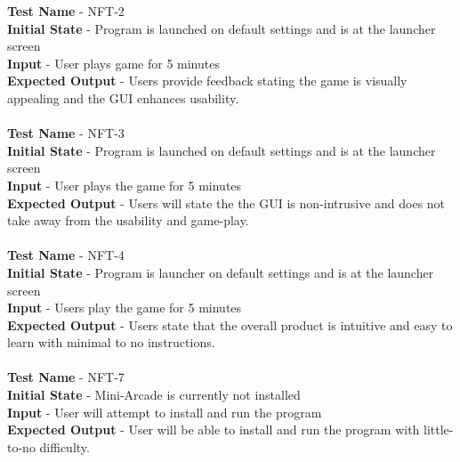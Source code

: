 \documentclass[12pt, titlepage]{article}
\begin{document}
\textbf{Test Name} - NFT-2\\
\textbf{Initial State} - Program is launched on default settings and is at the launcher screen\\
\textbf{Input} - User plays game for 5 minutes\\
\textbf{Expected Output} - Users provide feedback stating the game is visually appealing and the GUI enhances usability.\\ \\ 
\textbf{Test Name} - NFT-3\\
\textbf{Initial State} - Program is launched on default settings and is at the launcher screen\\
\textbf{Input} - User plays the game for 5 minutes\\
\textbf{Expected Output} - Users will state the the GUI is non-intrusive and does not take away from the usability and game-play.\\ \\ 
\textbf{Test Name} - NFT-4\\
\textbf{Initial State} - Program is launcher on default settings and is at the launcher screen\\
\textbf{Input} - Users play the game for 5 minutes\\
\textbf{Expected Output} - Users state that the overall product is intuitive and easy to learn with minimal to no instructions.\\ \\ 
\textbf{Test Name} - NFT-7\\
\textbf{Initial State} - Mini-Arcade is currently not installed\\
\textbf{Input} - User will attempt to install and run the program\\
\textbf{Expected Output} - User will be able to install and run the program with little-to-no difficulty.\\ \\ 
\end{document}
